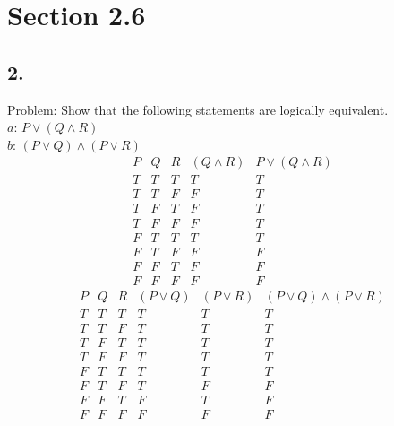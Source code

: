 \documentclass[12pt]{article}
\begin{document}
\begin{minipage}[t]{0.45\textwidth}
\section*{Section 2.6}
\subsection*{2.}
Problem: Show that the following statements are logically equivalent.\\
$ a $: $ P \lor (Q \land R) $\\
$ b $: $ (P \lor Q) \land (P \lor R) $ \\
\[
\begin{array}{c|c|c|c|c}
P & Q & R &(Q \land R) & P \lor (Q \land R)\\
\hline
T & T & T & T & T\\
T & T & F & F & T\\
T & F & T & F & T\\
T & F & F & F & T\\
F & T & T & T & T\\
F & T & F & F & F\\
F & F & T & F & F\\
F & F & F & F & F
\end{array}
\]
\[
\begin{array}{c|c|c|c|c|c}
P & Q & R &(P \lor Q) & (P \lor R) & (P \lor Q) \land (P \lor R)\\
\hline
T & T & T & T & T & T\\
T & T & F & T & T & T\\
T & F & T & T & T & T\\
T & F & F & T & T & T\\
F & T & T & T & T & T\\
F & T & F & T & F & F\\
F & F & T & F & T & F\\
F & F & F & F & F & F
\end{array}
\]

\end{minipage}
\end{document}
